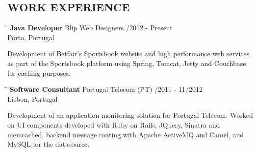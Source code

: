 \documentclass{res}
\begin{document}
                               				         
\address{\bf  PRESENT ADDRESS\\Places and stuff\\cities and the like\\(351) 55
555 555} \address{\bf PERMANENT ADDRESS\\Home town\\ home city\\  (351) 55 555
5555}
                               				               
\begin{resume}

\section{WORK EXPERIENCE}

\vspace{-0.1in}
\begin{tabbing}
\hspace{2.3in}\= \hspace{2.6in}\= \kill %
{\bf Java Developer} \>Blip Web Designers /2012 -
Present\\
\>Porto, Portugal
\end{tabbing}\vspace{-20pt}      %
Development of Betfair's Sportsbook website and high performance web
services as part of the Sportsbook platform using Spring, Tomcat, Jetty and
Couchbase for caching purposes.

\begin{tabbing}
\hspace{2.3in}\= \hspace{2.6in}\= \kill %
{\bf Software Consultant} \>Portugal Telecom (PT)     /2011 - 11/2012\\
\>Lisbon, Portugal
\end{tabbing}\vspace{-20pt}      %
Development of an application monitoring solution for Portugal Telecom.
Worked on UI components developed with Ruby on Rails, JQuery, Sinatra and memcached, backend message routing with Apache ActiveMQ and Camel, and MySQL for the datasource.


\end{resume}
\end{document}
